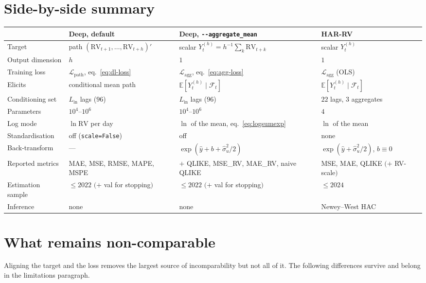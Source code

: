 \documentclass[11pt,a4paper]{article}
\newcommand{\RV}{\mathrm{RV}}
\newcommand{\E}{\mathbb{E}}
\newcommand{\Fset}{\mathcal{F}}
\newcommand{\Lpath}{\mathcal{L}_{\mathrm{path}}}
\newcommand{\Lagg}{\mathcal{L}_{\mathrm{agg}}}
\newcommand{\Lin}{L_{\mathrm{in}}}
\begin{document}
\section{Side-by-side summary}
\label{sec:summary}

\begin{center}
\small
\begin{tabular}{@{}p{3.1cm}p{3.9cm}p{3.9cm}p{3.4cm}@{}}
\toprule
 & \textbf{Deep, default} & \textbf{Deep, \texttt{-{}-aggregate\_mean}} & \textbf{HAR-RV} \\
\midrule
Target
 & path $(\RV_{t+1},\dots,\RV_{t+h})'$
 & scalar $Y^{(h)}_t=h^{-1}\sum_k \RV_{t+k}$
 & scalar $Y^{(h)}_t$ \\[2pt]
Output dimension
 & $h$
 & $1$
 & $1$ \\[2pt]
Training loss
 & $\Lpath$, eq.\ \eqref{eq:dl-loss}
 & $\Lagg$, eq.\ \eqref{eq:agg-loss}
 & $\Lagg$ (OLS) \\[2pt]
Elicits
 & conditional mean path
 & $\E[Y^{(h)}_t\mid\Fset_t]$
 & $\E[Y^{(h)}_t\mid\Fset_t]$ \\[2pt]
Conditioning set
 & $\Lin$ lags ($96$)
 & $\Lin$ lags ($96$)
 & $22$ lags, 3 aggregates \\[2pt]
Parameters
 & $10^{4}$--$10^{6}$
 & $10^{4}$--$10^{6}$
 & $4$ \\[2pt]
Log mode
 & $\ln \RV$ per day
 & $\ln$ of the mean, eq.\ \eqref{eq:logsumexp}
 & $\ln$ of the mean \\[2pt]
Standardisation
 & off (\texttt{scale=False})
 & off
 & none \\[2pt]
Back-transform
 & ---
 & $\exp(\hat y+b+\hat\sigma_u^2/2)$
 & $\exp(\hat y+\hat\sigma_u^2/2)$, $b\equiv0$ \\[2pt]
Reported metrics
 & MAE, MSE, RMSE, MAPE, MSPE
 & $+$ QLIKE, MSE\_RV, MAE\_RV, naive QLIKE
 & MSE, MAE, QLIKE $(+$ RV-scale$)$ \\[2pt]
Estimation sample
 & $\le 2022$ $(+$ val for stopping$)$
 & $\le 2022$ $(+$ val for stopping$)$
 & $\le 2024$ \\[2pt]
Inference
 & none
 & none
 & Newey--West HAC \\
\bottomrule
\end{tabular}
\end{center}

\section{What remains non-comparable}
\label{sec:caveats}

Aligning the target and the loss removes the largest source of incomparability but not all
of it. The following differences survive and belong in the limitations paragraph.
\end{document}
